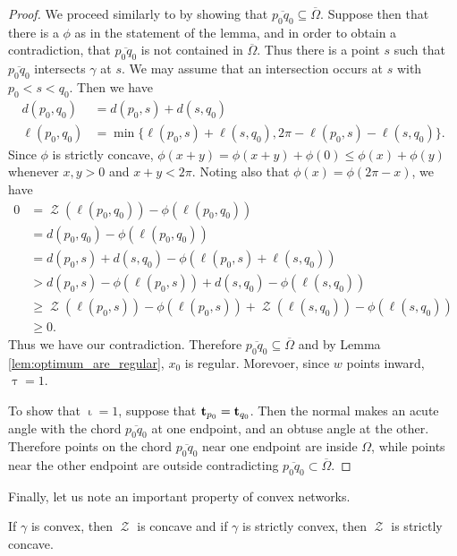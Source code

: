 \documentclass[11pt]{amsart}
\DeclareMathOperator{\chordarcprofile}{\mathcal{Z}}
\DeclareMathOperator{\tangindicator}{\iota}
\DeclareMathOperator{\norindicator}{\tau}
\begin{document}
\begin{proof}
We proceed similarly to \cite{MR2794630} by showing that $\overline{p_0q_0} \subseteq \overline{\Omega}$. Suppose then that there is a $\phi$ as in the statement of the lemma, and in order to obtain a contradiction, that $\overline{p_0q_0}$ is not contained in $\overline{\Omega}$. Thus there is a point $s$ such that $\overline{p_0q_0}$ intersects $\gamma$ at $s$. We may assume that an intersection occurs at $s$ with $p_0 < s < q_0$. Then we have
\begin{align*}
d(p_0, q_0) &= d(p_0, s) + d(s, q_0) \\
\ell(p_0, q_0) &= \min\{\ell(p_0, s) + \ell(s, q_0),  2\pi -\ell(p_0,s ) - \ell(s, q_0)\}.
\end{align*}
Since $\phi$ is strictly concave, $\phi(x + y) = \phi(x + y) + \phi(0) \leq \phi(x) + \phi(y)$ whenever $x, y > 0$ and $x + y < 2\pi$. Noting also that $\phi(x) = \phi(2\pi - x)$, we have
\[
\begin{split}
0 &= \chordarcprofile(\ell(p_0, q_0)) - \phi(\ell(p_0, q_0)) \\
&=  d(p_0, q_0) - \phi(\ell(p_0, q_0)) \\
&= d(p_0, s) + d(s, q_0) - \phi(\ell(p_0, s) + \ell(s,  q_0)) \\
&> d(p_0, s) - \phi(\ell(p_0, s)) + d(s, q_0) - \phi(\ell(s, q_0)) \\
&\geq \chordarcprofile(\ell(p_0, s)) - \phi(\ell(p_0, s)) + \chordarcprofile(\ell(s, q_0)) - \phi(\ell(s, q_0)) \\
&\geq 0.
\end{split}
\]
Thus we have our contradiction. Therefore $\overline{p_0q_0} \subseteq \overline{\Omega}$ and by Lemma \ref{lem:optimum_are_regular}, \(x_0\) is regular. Morevoer, since $w$ points inward, $\norindicator = 1$.

To show that $\tangindicator = 1$, suppose that $\operatorname{\mathbf{t}}_{p_0} = \operatorname{\mathbf{t}}_{q_0}$. Then the normal makes an acute angle with the chord $\overline{p_0 q_0}$ at one endpoint, and an obtuse angle at the other. Therefore points on the chord $\overline{p_0q_0}$ near one endpoint are inside $\Omega$, while points near the other endpoint are outside contradicting $\overline{p_0q_0} \subset \overline{\Omega}$.
\end{proof}

Finally, let us note an important property of convex networks.

\begin{theorem}
\label{thm:convex_network_concave_profile}

If $\gamma$ is convex, then $\chordarcprofile$ is concave and if $\gamma$ is strictly convex, then $\chordarcprofile$ is strictly concave.
\end{theorem}
\end{document}
